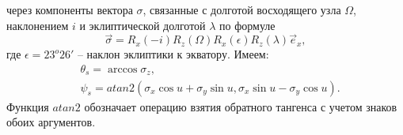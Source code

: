 через компоненты вектора $\sigma$, связанные с долготой восходящего узла $\Omega$,
наклонением $i$ и эклиптической долготой $\lambda$ по формуле
\begin{equation}
  \vec{\sigma} = R_x(-i)R_z(\Omega)R_x(\epsilon)R_z(\lambda)\vec{e}_x,
\end{equation}
где $\epsilon = 23^o26'$ -- наклон эклиптики к экватору. Имеем:
\begin{equation}
  \begin{aligned}
    & \theta_s = \arccos\sigma_z, \\
    & \psi_s = atan2(\sigma_x\cos u + \sigma_y\sin u, \sigma_x\sin u - \sigma_y\cos u).
  \end{aligned}
\end{equation}
Функция $atan2$ обозначает операцию взятия обратного тангенса с учетом знаков
обоих аргументов.
